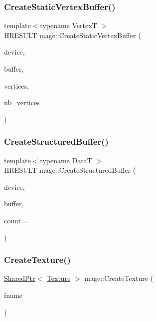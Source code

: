 \hypertarget{namespacemage_a7cf0754e3bc2681bc1990e64f4155032}{}\label{namespacemage_a7cf0754e3bc2681bc1990e64f4155032} 
\subsubsection{\texorpdfstring{Create\+Static\+Vertex\+Buffer()}{CreateStaticVertexBuffer()}}
{\footnotesize\ttfamily template$<$typename VertexT $>$ \\
H\+R\+E\+S\+U\+LT mage\+::\+Create\+Static\+Vertex\+Buffer (\begin{DoxyParamCaption}\item[{I\+D3\+D11\+Device2 $\ast$}]{device,  }\item[{I\+D3\+D11\+Buffer $\ast$$\ast$}]{buffer,  }\item[{const VertexT $\ast$}]{vertices,  }\item[{size\+\_\+t}]{nb\+\_\+vertices }\end{DoxyParamCaption})}

\hypertarget{namespacemage_a9090692dded3dfa6abbcb2023b1e6327}{}\label{namespacemage_a9090692dded3dfa6abbcb2023b1e6327} 
\subsubsection{\texorpdfstring{Create\+Structured\+Buffer()}{CreateStructuredBuffer()}}
{\footnotesize\ttfamily template$<$typename DataT $>$ \\
H\+R\+E\+S\+U\+LT mage\+::\+Create\+Structured\+Buffer (\begin{DoxyParamCaption}\item[{I\+D3\+D11\+Device2 $\ast$}]{device,  }\item[{I\+D3\+D11\+Buffer $\ast$$\ast$}]{buffer,  }\item[{size\+\_\+t}]{count = {} }\end{DoxyParamCaption})}

\hypertarget{namespacemage_ac27913e621bde0fd01312183aafaaca0}{}\label{namespacemage_ac27913e621bde0fd01312183aafaaca0} 
\subsubsection{\texorpdfstring{Create\+Texture()}{CreateTexture()}}
{\footnotesize\ttfamily \hyperlink{namespacemage_a1e01ae66713838a7a67d30e44c67703e}{Shared\+Ptr}$<$ \hyperlink{classmage_1_1_texture}{Texture} $>$ mage\+::\+Create\+Texture (\begin{DoxyParamCaption}\item[{const wstring \&}]{fname }\end{DoxyParamCaption})}

